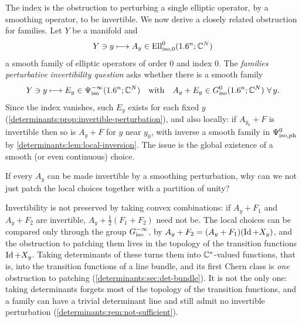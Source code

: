 The index is the obstruction to perturbing a single elliptic operator, by a
smoothing operator, to be invertible. We now derive a closely related
obstruction for families. Let $Y$ be a manifold and
\begin{equation}\label{determinants:eq:family}
  Y\ni y\longmapsto A_y\in\operatorname{Ell}^0_{\mathrm{iso},0}(1.6^n;\mathbb{C}^N)
\end{equation}
a smooth family of elliptic operators of order $0$ and index $0$. The
\emph{families perturbative invertibility question} asks whether there is a
smooth family
\begin{equation}\label{determinants:eq:perturbation}
  Y\ni y\longmapsto E_y\in\Psi^{-\infty}_{\mathrm{iso}}(1.6^n;\mathbb{C}^N)\quad\text{with}\quad A_y+E_y\in G^{0}_{\mathrm{iso}}(1.6^n;\mathbb{C}^N)\ \forall\,y.
\end{equation}
Since the index vanishes, such $E_y$ exists for each fixed $y$
(\cref{determinants:prop:invertible-perturbation}), and also locally: if
$A_{y_0}+F$ is invertible then so is $A_y+F$ for $y$ near $y_0$, with inverse
a smooth family in $\Psi^{0}_{\mathrm{iso,ph}}$ by \cref{determinants:lem:local-inversion}.
The issue is the global existence of a smooth (or even continuous) choice.

\begin{question}
If every $A_y$ can be made invertible by a smoothing perturbation, why can
we not just patch the local choices together with a partition of unity?
\end{question}
\begin{answer}
Invertibility is not preserved by taking convex combinations: if $A_y+F_1$
and $A_y+F_2$ are invertible, $A_y+\frac12(F_1+F_2)$ need not be. The local
choices can be compared only through the group $G^{-\infty}_{\mathrm{iso}}$, by
$A_y+F_2=(A_y+F_1)(\operatorname{Id}+X_y)$, and the obstruction to patching them lives in
the topology of the transition functions $\operatorname{Id}+X_y$. Taking determinants of
these turns them into $\mathbb{C}^*$-valued functions, that is, into the transition
functions of a line bundle, and its first Chern class is \emph{one}
obstruction to patching (\cref{determinants:sec:det-bundle}). It is not the
only one: taking determinants forgets most of the topology of the
transition functions, and a family can have a trivial determinant line and
still admit no invertible perturbation (\cref{determinants:rem:not-sufficient}).
\end{answer}

